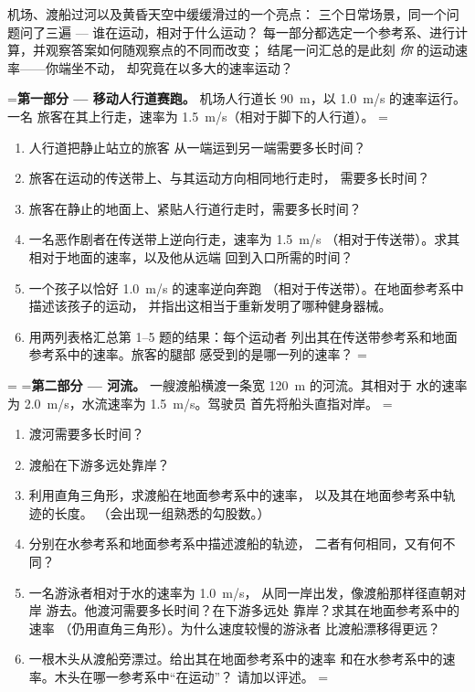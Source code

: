 \begin{problem}
\label{pb:g10:relative-motion:1}
机场、渡船过河以及黄昏天空中缓缓滑过的一个亮点：
三个日常场景，同一个问题问了三遍 --- 谁在运动，相对于什么运动？
每一部分都选定一个参考系、进行计算，并观察答案如何随观察点的不同而改变；
结尾一问汇总的是此刻 \emph{你} 的运动速率——你端坐不动，
却究竟在以多大的速率运动？

\medskip
=\noindent\textbf{第一部分 --- 移动人行道赛跑。}
机场人行道长 \qty{90}{m}，以 \qty{1.0}{m/s} 的速率运行。一名
旅客在其上行走，速率为 \qty{1.5}{m/s}（相对于脚下的人行道）。
=\begin{enumerate}
  \item 人行道把静止站立的旅客
        从一端运到另一端需要多长时间？
  \item 旅客在运动的传送带上、与其运动方向相同地行走时，
        需要多长时间？
  \item 旅客在静止的地面上、紧贴人行道行走时，需要多长时间？
  \item 一名恶作剧者在传送带上逆向行走，速率为 \qty{1.5}{m/s}
        （相对于传送带）。求其相对于地面的速率，以及他从远端
        回到入口所需的时间？
  \item 一个孩子以恰好 \qty{1.0}{m/s} 的速率逆向奔跑
        （相对于传送带）。在地面参考系中描述该孩子的运动，
        并指出这相当于重新发明了哪种健身器械。
  \item 用两列表格汇总第 1--5 题的结果：每个运动者
        列出其在传送带参考系和地面参考系中的速率。旅客的腿部
        感受到的是哪一列的速率？
=\end{enumerate}

=\medskip
=\noindent\textbf{第二部分 --- 河流。}
一艘渡船横渡一条宽 \qty{120}{m} 的河流。其相对于
水的速率为 \qty{2.0}{m/s}，水流速率为 \qty{1.5}{m/s}。驾驶员
首先将船头直指对岸。
=\begin{enumerate}[resume]
  \item 渡河需要多长时间？
  \item 渡船在下游多远处靠岸？
  \item 利用直角三角形，求渡船在地面参考系中的速率，
        以及其在地面参考系中轨迹的长度。
        （会出现一组熟悉的勾股数。）
  \item 分别在水参考系和地面参考系中描述渡船的轨迹，
        二者有何相同，又有何不同？
  \item 一名游泳者相对于水的速率为 \qty{1.0}{m/s}，
        从同一岸出发，像渡船那样径直朝对岸
        游去。他渡河需要多长时间？在下游多远处
        靠岸？求其在地面参考系中的速率
        （仍用直角三角形）。为什么速度较慢的游泳者
        比渡船漂移得更远？
  \item 一根木头从渡船旁漂过。给出其在地面参考系中的速率
        和在水参考系中的速率。木头在哪一参考系中“在运动”？
        请加以评述。
=\end{enumerate}


\end{problem}
